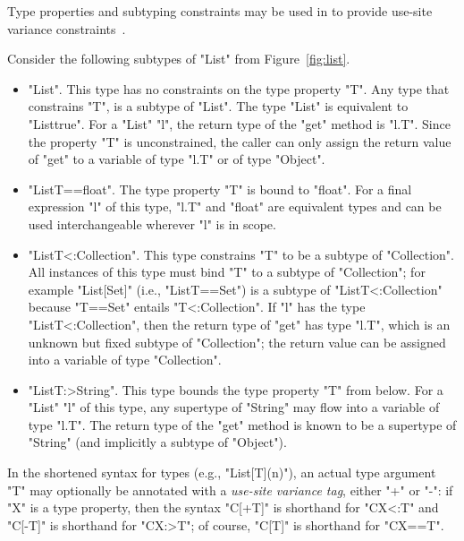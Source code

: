 Type properties and subtyping constraints may be used in \Xten{} to 
provide use-site variance
constraints~\cite{variant-parametric-types}.

Consider the following subtypes  of \xcd"List" from
Figure~\ref{fig:list}.
\begin{itemize}
\item \xcd"List".  This type has no constraints on the type
property \xcd"T".
Any type that constrains \xcd"T",
is a subtype of \xcd"List".  The type \xcd"List" is equivalent to
\xcd"List{true}".
%
For a \xcd"List" \xcd"l", the return type of the \xcd"get" method
is \xcd"l.T".
Since the property \xcd"T" is unconstrained,
the caller can only assign the return value of \xcd"get"
to a variable of type \xcd"l.T" or of type \xcd"Object".

\item \xcd"List{T==float}".
The type property \xcd"T" is bound to \xcd"float".
For a final expression \xcd"l" of this type,
\xcd"l.T" and \xcd"float" are equivalent types and can be used
interchangeable wherever \xcd"l" is in scope.

\item \xcd"List{T<:Collection}".
This type constrains \xcd"T" to be a subtype of \xcd"Collection".
All instances of this type must bind \xcd"T" to a subtype of
\xcd"Collection"; for example \xcd"List[Set]" (i.e.,
\xcd"List{T==Set}") is a subtype of
\xcd"List{T<:Collection}" because \xcd"T==Set" entails
\xcd"T<:Collection".
%
If \xcd"l" has the type \xcd"List{T<:Collection}",
then the return type of \xcd"get" has type \xcd"l.T", which is an unknown but
fixed subtype of \xcd"Collection"; the return value can be
assigned into a variable of type \xcd"Collection".

\item \xcd"List{T:>String}".  This type bounds the type property
\xcd"T"
from below.  For a \xcd"List" \xcd"l" of this type, any
supertype of \xcd"String" may flow into a variable of type \xcd"l.T".
The return type of the \xcd"get"
method is known to be a
supertype of \xcd"String" (and implicitly a subtype of \xcd"Object").
\end{itemize}

In the shortened syntax for types (e.g., \xcd"List[T](n)"),
an actual type argument \xcd"T" may optionally
be annotated
with
a \emph{use-site variance tag}, either \xcd"+" or \xcd"-":
if \xcd"X" is a type property, then
the syntax \xcd"C[+T]" is shorthand for \xcd"C{X<:T}" and
\xcd"C[-T]" is shorthand for \xcd"C{X:>T}"; of course,
\xcd"C[T]" is shorthand for \xcd"C{X==T}".

